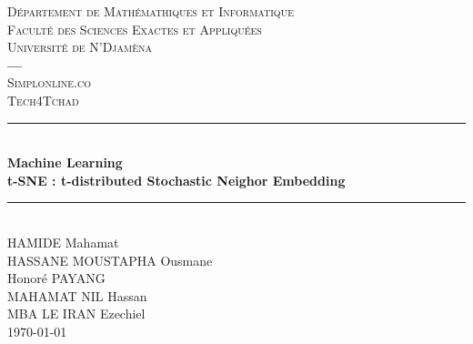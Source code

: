 \documentclass[12pt,a4paper]{article}
\begin{document}
	\begin{titlepage}
		\newcommand{\HRule}{\rule{\linewidth}{0.5mm}}
		\center
		\textsc{\large
			Département de Mathémathiques et Informatique \\[0.25cm]
			Faculté des Sciences Exactes et Appliquées \\[0.25cm]
			Université de N'Djamèna \\[0.25cm]
			\centering \textbf{---}\\[0.25cm]
			Simplonline.co \\[0.25cm] Tech4Tchad 
		} \\[1.5cm]
		\HRule \\[0.15cm]
		{ %
			\bfseries Machine Learning \\ t-SNE : t-distributed Stochastic Neighor Embedding \\[0.15cm] }
		\HRule \\[1.5cm]
		HAMIDE Mahamat \\
		HASSANE MOUSTAPHA Ousmane \\
		Honoré PAYANG \\
		MAHAMAT NIL Hassan \\
		MBA LE IRAN Ezechiel
		\\[1.5cm]
		\today \\ [1cm]
	\end{titlepage}

	\tableofcontents
	\thispagestyle{empty}
	
	
	
	
	\newpage
	\listoffigures
	
\end{document}
